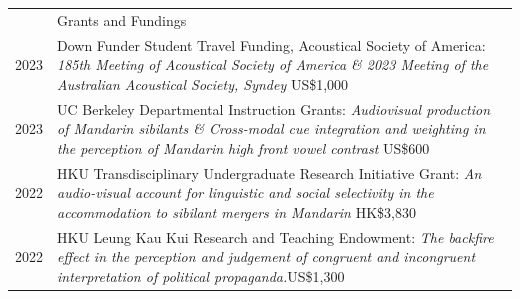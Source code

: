 \documentclass[letterpaper, 11pt]{article}
\newcommand{\headingfont}{\Large\color{MidnightBlue}}
\newenvironment{SectionTable}[1]{
	\renewcommand*{\arraystretch}{1.7}
	\setlength{\tabcolsep}{10pt}
	\begin{longtable}{Rp{6.3in}} & #1 \\}
{\end{longtable}\vspace{-.3cm}}
\begin{document}





\newpage
\begin{SectionTable}{\headingfont Grants and Fundings}

2023 &
Down Funder Student Travel Funding, Acoustical Society of America: \textit{185th Meeting of Acoustical Society of America \& 2023 Meeting of the Australian Acoustical Society, Syndey} \hfill US\$1,000\\

2023 &
UC Berkeley Departmental Instruction Grants: \textit{Audiovisual production of Mandarin sibilants \& Cross-modal cue integration and weighting in the perception of Mandarin high front vowel contrast} \hfill US\$600 \\

2022&
HKU Transdisciplinary Undergraduate Research Initiative Grant: \textit{An audio-visual account for linguistic and social selectivity in the accommodation to sibilant mergers in Mandarin} \hfill HK\$3,830 \\

2022&
HKU Leung Kau Kui Research and Teaching Endowment: \textit{The backfire effect in the perception and judgement of congruent and incongruent interpretation of political propaganda.}\hfill US\$1,300 \\
\end{SectionTable}
\end{document}
